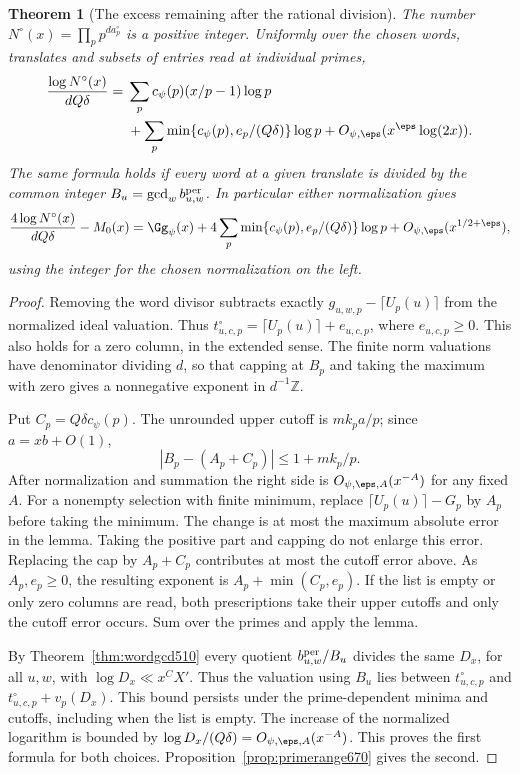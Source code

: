 \documentclass[a4paper,11pt]{article}
\newtheorem{theorem}[proposition]{Theorem}
\theoremstyle{definition}
\theoremstyle{remark}
\numberwithin{equation}{section}
\begin{document}
\begin{theorem}[The excess remaining after the rational division]
\leavevmode\label{thm:residualvaluation673}
The number \(N^\circ(x)=\prod_p p^{d a_p^\circ}\) is a positive
integer. Uniformly over the chosen words, translates and subsets
of entries read at individual primes,
\[
 \begin{aligned}
 \frac{\log N^\circ(x)}{dQ\delta}
  ={}&\sum_p c_\psi(p)(x/p-1)\log p\\
     &+\sum_p\min\{c_\psi(p),e_p/(Q\delta)\}\log p
                 +O_{\psi,\eps}(x^\eps\log(2x)).
 \end{aligned}
\]
The same formula holds if every word at a given translate is
divided by the common integer \(B_u=\gcd_w b^{\rm per}_{u,w}\).
In particular either normalization gives
\[
 \frac{4\log N^\circ(x)}{dQ\delta}-M_0(x)
   =\Gg_\psi(x)+4\sum_p\min\{c_\psi(p),e_p/(Q\delta)\}\log p
                     +O_{\psi,\eps}(x^{1/2+\eps}),
\]
using the integer for the chosen normalization on the left.
\end{theorem}
\begin{proof}
Removing the word divisor subtracts exactly
\(g_{u,w,p}-\lceil U_p(u)\rceil\) from the normalized ideal
valuation. Thus
\(t^\circ_{u,c,p}=\lceil U_p(u)\rceil+e_{u,c,p}\), where
\(e_{u,c,p}\ge0\). This also holds for a zero column, in the
extended sense. The finite norm valuations have denominator
dividing \(d\), so that capping at \(B_p\) and taking the
maximum with zero gives a nonnegative exponent in
\(d^{-1}\mathbb Z\).

Put \(C_p=Q\delta c_\psi(p)\). The unrounded upper cutoff is
\(mk_pa/p\); since \(a=xb+O(1)\),
\[
          |B_p-(A_p+C_p)|\le 1+mk_p/p .
\]
After normalization and summation the right side is
\(O_{\psi,\eps,A}(x^{-A})\) for any fixed \(A\).
For a nonempty selection with finite minimum, replace
\(\lceil U_p(u)\rceil-G_p\) by \(A_p\) before taking the minimum.
The change is at most the maximum absolute error in the lemma.
Taking the positive part and capping do not enlarge this
error. Replacing the cap by \(A_p+C_p\) contributes at most the
cutoff error above. As \(A_p,e_p\ge0\), the resulting exponent
is \(A_p+\min(C_p,e_p)\). If the list is empty or only zero
columns are read, both prescriptions take their upper cutoffs
and only the cutoff error occurs. Sum over the primes and
apply the lemma.

By Theorem~\ref{thm:wordgcd510} every quotient
\(b^{\rm per}_{u,w}/B_u\) divides the same \(D_x\), for all
\(u,w\), with \(\log D_x\ll x^C X'\). Thus the valuation using
\(B_u\) lies between \(t^\circ_{u,c,p}\) and
\(t^\circ_{u,c,p}+v_p(D_x)\). This bound persists under the
prime-dependent minima and cutoffs, including when the list is
empty. The increase of the normalized logarithm is bounded by
\(\log D_x/(Q\delta)=O_{\psi,\eps,A}(x^{-A})\). This proves the
first formula for both choices. Proposition~\ref{prop:primerange670}
gives the second.
\end{proof}
\end{document}
